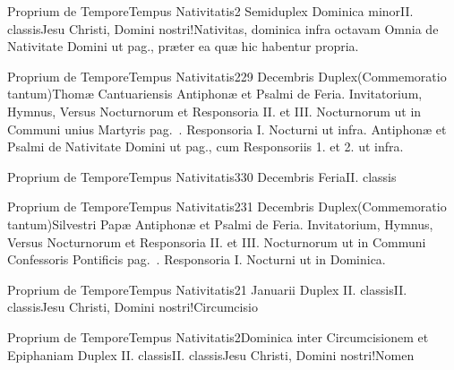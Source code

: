 \documentclass[nocturnale-romanum.tex]{subfiles}
\begin{document}
	{Proprium de Tempore}{Tempus Nativitatis}{2}{}
	{Semiduplex Dominica minor}{II. classis}{Jesu Christi, Domini nostri!Nativitas, dominica infra octavam}
	{Omnia de Nativitate Domini ut pag.\pageref{M-1225}, præter ea quæ hic habentur propria.}
	{}

	{Proprium de Tempore}{Tempus Nativitatis}{2}{29 Decembris}
	{Duplex}{(Commemoratio tantum)}{Thomæ Cantuariensis}
	{Antiphonæ et Psalmi de Feria. Invitatorium, Hymnus, Versus Nocturnorum et Responsoria II. et III. Nocturnorum ut in Communi unius Martyris pag.\ \pageref{M-UMEX}. Responsoria I. Nocturni ut infra.}
	{Antiphonæ et Psalmi de Nativitate Domini ut pag.\pageref{M-1225}, cum Responsoriis 1. et 2. ut infra.}

	{Proprium de Tempore}{Tempus Nativitatis}{3}{30 Decembris}
	{Feria}{II. classis}
	{}
	{}
\tedeumrubric

	{Proprium de Tempore}{Tempus Nativitatis}{2}{31 Decembris}
	{Duplex}{(Commemoratio tantum)}{Silvestri Papæ}
	{Antiphonæ et Psalmi de Feria. Invitatorium, Hymnus, Versus Nocturnorum et Responsoria II. et III. Nocturnorum ut in Communi Confessoris Pontificis pag.\ \pageref{M-COPO}. Responsoria I. Nocturni ut in Dominica.}
	{}

	{Proprium de Tempore}{Tempus Nativitatis}{2}{1 Januarii}
	{Duplex II. classis}{II. classis}{Jesu Christi, Domini nostri!Circumcisio}
	{}
	{}

	{Proprium de Tempore}{Tempus Nativitatis}{2}{Dominica inter Circumcisionem et Epiphaniam}
	{Duplex II. classis}{II. classis}{Jesu Christi, Domini nostri!Nomen}
	{}
	{}
\end{document}
